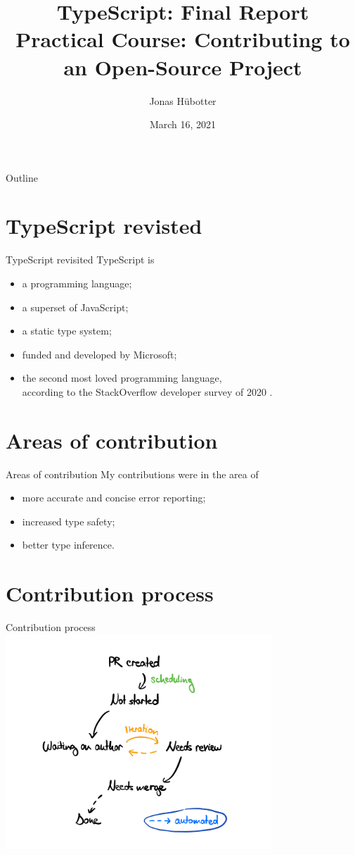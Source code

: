 \documentclass{beamer}
\title{TypeScript: Final Report \\[0.1cm] \small{Practical Course: Contributing to an Open-Source Project}}
\author{Jonas Hübotter}
\date{March 16, 2021}
\theoremstyle{definition}
\begin{document}
\begin{frame}
  \titlepage
\end{frame}

\begin{frame}{Outline}
 \tableofcontents
\end{frame}

\section{TypeScript revisted}
\begin{frame}{TypeScript revisited}
TypeScript is
\begin{itemize}
    \item a programming language\pause;
    \item a superset of JavaScript\pause;
    \item a static type system\pause;
    \item funded and developed by Microsoft\pause;
    \item the second most loved programming language, \\ according to the StackOverflow developer survey of 2020 \cite{StackOverflow2020}.
\end{itemize}
\end{frame}

\section{Areas of contribution}
\begin{frame}{Areas of contribution}
My contributions were in the area of
\begin{itemize}
    \item more accurate and concise error reporting;
    \item increased type safety;
    \item better type inference.
\end{itemize}
\end{frame}

\section{Contribution process}
\begin{frame}{Contribution process}\pause
\centering
\includegraphics[width=10cm]{images/pr_backlog.png}
\end{frame}
\end{document}

